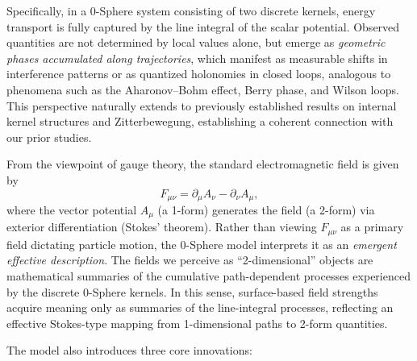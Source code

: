\documentclass[%
 reprint,
 amsmath,amssymb,
 aps,
 prb,
]{revtex4-2}
\numberwithin{equation}{section}
\begin{document}
Specifically, in a 0-Sphere system consisting of two discrete kernels, energy transport is fully captured by the line integral of the scalar potential. 
Observed quantities are not determined by local values alone, but emerge as \emph{geometric phases accumulated along trajectories}, which manifest as measurable shifts in interference patterns or as quantized holonomies in closed loops, analogous to phenomena such as the Aharonov--Bohm effect, Berry phase, and Wilson loops. 
This perspective naturally extends to previously established results on internal kernel structures and Zitterbewegung, establishing a coherent connection with our prior studies.

From the viewpoint of gauge theory, the standard electromagnetic field is given by
\begin{equation}
F_{\mu\nu} = \partial_\mu A_\nu - \partial_\nu A_\mu,
\end{equation}
where the vector potential $A_\mu$ (a 1-form) generates the field (a 2-form) via exterior differentiation (Stokes' theorem). 
Rather than viewing $F_{\mu\nu}$ as a primary field dictating particle motion, the 0-Sphere model interprets it as an \emph{emergent effective description}. 
The fields we perceive as ``2-dimensional'' objects are mathematical summaries of the cumulative path-dependent processes experienced by the discrete 0-Sphere kernels. 
In this sense, surface-based field strengths acquire meaning only as summaries of the line-integral processes, reflecting an effective Stokes-type mapping from 1-dimensional paths to 2-form quantities.

\medskip
The model also introduces three core innovations:
\end{document}
